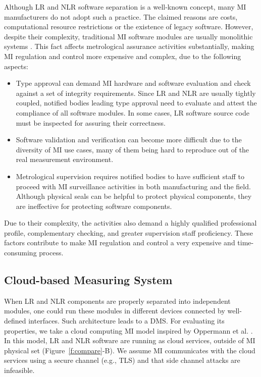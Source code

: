 \documentclass[journal]{IEEEtran}
\begin{document}
Although LR and NLR software separation is a well-known concept, many MI manufacturers do not adopt such a practice.
The claimed reasons are costs, computational resource restrictions or the existence of legacy software. 
However, despite their complexity, traditional MI software modules are usually monolithic systems \cite{Abreu2017}. 
This fact affects metrological assurance activities substantially, making MI regulation and control more expensive and complex, due to the following aspects:
\begin{itemize}
\item Type approval can demand MI hardware and software evaluation and check against a set of integrity requirements. Since LR and NLR are usually tightly coupled, notified bodies leading type approval need to evaluate and attest the compliance of all software modules. In some cases, LR software source code must be inspected for assuring their correctness.
\item Software validation and verification can become more difficult due to the diversity of MI use cases, many of them being hard to reproduce out of the real measurement environment. 
\item Metrological supervision requires notified bodies to have sufficient staff to proceed with MI surveillance activities in both manufacturing and the field. Although physical seals can be helpful to protect physical components, they are ineffective for protecting software components.
\end{itemize}

Due to their complexity, the activities also demand a highly qualified professional profile, complementary checking, and greater supervision staff proficiency. These factors contribute to make MI regulation and control a very expensive and time-consuming process.

\subsection{Cloud-based Measuring System}
\label{s:mi_cloud}
When LR and NLR components are properly separated into independent modules, one could run these modules in different devices connected by well-defined interfaces.
Such architecture leads to a DMS.
For evaluating its properties, we take a cloud computing MI model inspired by Oppermann et al. \cite{Oppermann2018}.
In this model, LR and NLR software are running as cloud services, outside of MI physical set (Figure~\ref{f:compare}-B).
We assume MI communicates with the cloud services using a secure channel (e.g., TLS) and that side channel attacks are infeasible.
\end{document}
